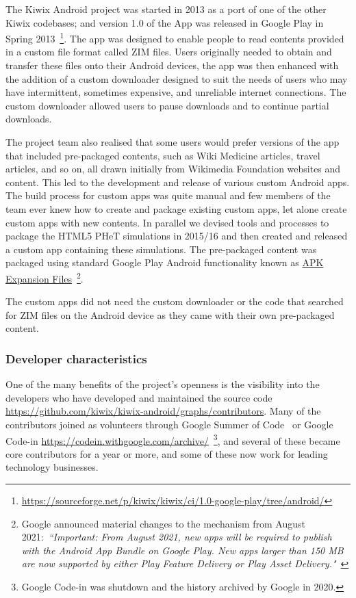 The Kiwix Android project was started in 2013 as a port of one of the other Kiwix codebases; and version 1.0 of the App was released in Google Play in Spring 2013~\footnote{\url{https://sourceforge.net/p/kiwix/kiwix/ci/1.0-google-play/tree/android/}}. The app was designed to enable people to read contents provided in a custom file format called ZIM files. Users originally needed to obtain and transfer these files onto their Android devices, the app was then enhanced with the addition of a custom downloader designed to suit the needs of users who may have intermittent, sometimes expensive, and unreliable internet connections. The custom downloader allowed users to pause downloads and to continue partial downloads.

The project team also realised that some users would prefer versions of the app that included pre-packaged contents, such as Wiki Medicine articles, travel articles, and so on, all drawn initially from Wikimedia Foundation websites and content. This led to the development and release of various custom Android apps. The build process for custom apps was quite manual and few members of the team ever knew how to create and package existing custom apps, let alone create custom apps with new contents.  In parallel we devised tools and processes to package the HTML5 PHeT simulations in 2015/16 and then created and released a custom app containing these simulations. The pre-packaged content was packaged using standard Google Play Android functionality known as \href{https://developer.android.com/google/play/expansion-files}{APK Expansion Files}~\footnote{Google announced material changes to the mechanism from August 2021:~\emph{``Important: From August 2021, new apps will be required to publish with the Android App Bundle on Google Play. New apps larger than 150 MB are now supported by either Play Feature Delivery or Play Asset Delivery."}~\citep{apk_expansion_files}}. %

The custom apps did not need the custom downloader or the code that searched for ZIM files on the Android device as they came with their own pre-packaged content.


\subsubsection{Developer characteristics}
One of the many benefits of the project’s openness is the visibility into the developers who have developed and maintained the source code \url{https://github.com/kiwix/kiwix-android/graphs/contributors}. Many of the contributors joined as volunteers through Google Summer of Code~\citep{google_summer_of_code} or Google Code-in \url{https://codein.withgoogle.com/archive/}~\footnote{Google Code-in was shutdown and the history archived by Google in 2020.}, and several of these became core contributors for a year or more, and some of these now work for leading technology businesses. 

